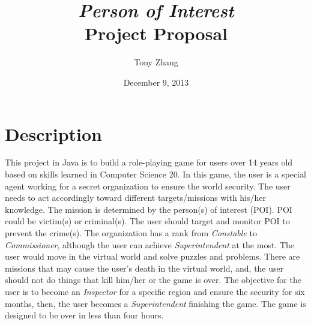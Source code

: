 \documentclass[letterpaper,12pt]{article}
\begin{document}
\title{\textit{Person of Interest}
\\
Project Proposal
}
\date{December 9, 2013}
\author{Tony Zhang}
\maketitle

\section{Description}
	This project in Java is to build a role-playing game for users over 14 years old based on skills learned in Computer Science 20. In this game, the user is a special agent working for a secret organization to ensure the world security. The user needs to act accordingly toward different targets/missions with his/her knowledge. The mission is determined by the person(s) of interest (POI). POI could be victim(s) or criminal(s). The user should target and monitor POI to prevent the crime(s). The organization has a rank from \textit{Constable} to \textit{Commissioner}, although the user can achieve \textit{Superintendent} at the most. The user would move in the virtual world and solve puzzles and problems. There are missions that may cause the user's death in the virtual world, and, the user should not do things that kill him/her or the game is over. The objective for the user is to become an \textit{Inspector} for a specific region and ensure the security for six months, then, the user becomes a \textit{Superintendent} finishing the game. The game is designed to be over in less than four hours.
\end{document}

